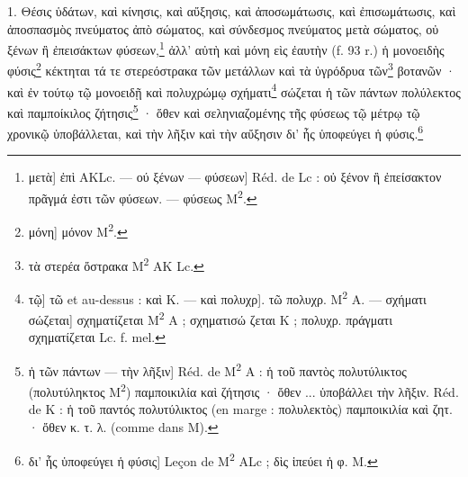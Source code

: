 \documentclass[landscape, a4paper, 11pt, oneside, polutonikogreek, french]{article}
\begin{document}
\bigskip

1. Θέσις ὑδάτων, καὶ κίνησις, καὶ αὔξησις, καὶ ἀποσωμάτωσις, καὶ ἐπισωμάτωσις, καὶ ἀποσπασμὸς πνεύματος ἀπὸ σώματος, καὶ σύνδεσμος πνεύματος μετὰ σώματος, οὐ ξένων ἢ ἐπεισάκτων φύσεων,\footnote{μετὰ] ἐπὶ AKLc. --- ού ξένων --- φύσεων] Réd. de Lc : οὐ ξένον ἢ ἐπείσακτον πρᾶγμά ἐστι τῶν φύσεων. --- φύσεως M\textsuperscript{2}.} ἀλλ' αὐτὴ καὶ μόνη εὶς ἐαυτὴν (f. 93 r.) ἡ μονοειδὴς φύσις\footnote{μόνη] μόνον M\textsuperscript{2}.} κέκτηται τά τε στερεόστρακα τῶν μετάλλων καὶ τὰ ὑγρόδρυα τῶν\footnote{τὰ στερέα ὄστρακα M\textsuperscript{2} AK Lc.} βοτανῶν · καὶ ἐν τούτῳ τῷ μονοειδῇ καὶ πολυχρώμῳ σχήματι\footnote{τῷ] τῶ et au-dessus : καὶ K. --- καὶ πολυχρ]. τῶ πολυχρ. M\textsuperscript{2} A. --- σχήματι σώζεται] σχηματίζεται M\textsuperscript{2} A ; σχηματισώ ζεται K ; πολυχρ. πράγματι σχηματίζεται Lc. f. mel.} σώζεται ἡ τῶν πάντων πολύλεκτος καὶ παμποίκιλος ζήτησις\footnote{ἡ τῶν πάντων --- τὴν λῆξιν] Réd. de M\textsuperscript{2} A : ἡ τοῦ παντὸς πολυτύλικτος (πολυτύληκτος M\textsuperscript{2}) παμποικιλία καὶ ζήτησις · ὄθεν ... ὑποβάλλει τὴν λῆξιν. Réd. de K : ἡ τοῦ παντός πολυτύλικτος (en marge : πολυλεκτὸς) παμποικιλία καὶ ζητ. · ὄθεν κ. τ. λ. (comme dans M).} · ὅθεν καὶ σεληνιαζομένης τῆς φύσεως τῷ μέτρῳ τῷ χρονικῷ ὑποβάλλεται, καὶ τὴν λῆξιν καὶ τὴν αὔξησιν δι' ἦς ὑποφεύγει ἡ φύσις.\footnote{δι' ἧς ὑποφεύγει ἡ φύσις] Leçon de M\textsuperscript{2} ALc ; δὶς ἱπεύει ἡ φ. M.}
\end{document}
